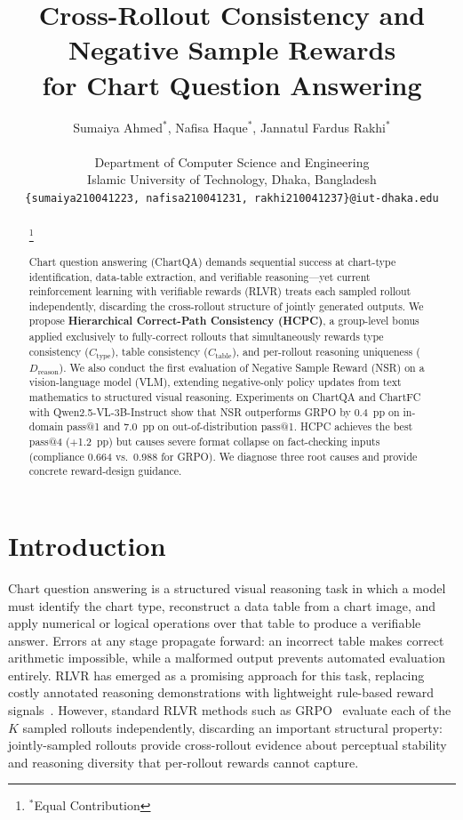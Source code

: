 \documentclass[11pt]{article}
\title{Cross-Rollout Consistency and Negative Sample Rewards\\
       for Chart Question Answering}
\author{Sumaiya Ahmed$^{*}$, Nafisa Haque$^{*}$, Jannatul Fardus Rakhi$^{*}$ \\
  \\
  Department of Computer Science and Engineering \\
  Islamic University of Technology, Dhaka, Bangladesh \\
  \texttt{\{sumaiya210041223, nafisa210041231, rakhi210041237\}@iut-dhaka.edu}}
\newcommand\blfootnote[1]{%
  \begingroup
  \renewcommand\thefootnote{}\footnote{#1}%
  \addtocounter{footnote}{-1}%
  \endgroup
}
\newcommand{\hcpc}{\textsc{HCPC}}
\newcommand{\rlvr}{\textsc{RLVR}}
\newcommand{\grpo}{\textsc{GRPO}}
\newcommand{\nsr}{\textsc{NSR}}
\begin{document}
\maketitle

\begin{abstract}
\blfootnote{$^*$Equal Contribution}
Chart question answering (ChartQA) demands sequential success at chart-type
identification, data-table extraction, and verifiable reasoning---yet current
reinforcement learning with verifiable rewards (\rlvr) treats each sampled
rollout independently, discarding the cross-rollout structure of jointly
generated outputs.
We propose \textbf{Hierarchical Correct-Path Consistency (\hcpc)}, a group-level
bonus applied exclusively to fully-correct rollouts that simultaneously rewards
type consistency ($C_\text{type}$), table consistency ($C_\text{table}$), and
per-rollout reasoning uniqueness ($D_\text{reason}$).
We also conduct the first evaluation of Negative Sample Reward (\nsr) on a
vision-language model (VLM), extending negative-only policy updates from text
mathematics to structured visual reasoning.
Experiments on ChartQA and ChartFC with Qwen2.5-VL-3B-Instruct show that
\nsr{} outperforms \grpo{} by 0.4~pp on in-domain pass@1 and 7.0~pp on
out-of-distribution pass@1. \hcpc{} achieves the best pass@4 ($+$1.2~pp) but
causes severe format collapse on fact-checking inputs (compliance 0.664 vs.\ 0.988
for \grpo). We diagnose three root causes and provide concrete reward-design
guidance.
\end{abstract}

\section{Introduction}

Chart question answering is a structured visual reasoning task in which a model
must identify the chart type, reconstruct a data table from a chart image, and
apply numerical or logical operations over that table to produce a verifiable
answer.
Errors at any stage propagate forward: an incorrect table makes correct arithmetic
impossible, while a malformed output prevents automated evaluation entirely.
\rlvr{} has emerged as a promising approach for this task, replacing costly
annotated reasoning demonstrations with lightweight rule-based reward
signals~\citep{sinha2025chartrvr}.
However, standard \rlvr{} methods such as \grpo{}~\citep{shao2024deepseekmath}
evaluate each of the $K$ sampled rollouts independently, discarding an important
structural property: jointly-sampled rollouts provide cross-rollout evidence about
perceptual stability and reasoning diversity that per-rollout rewards cannot
capture.
\end{document}
